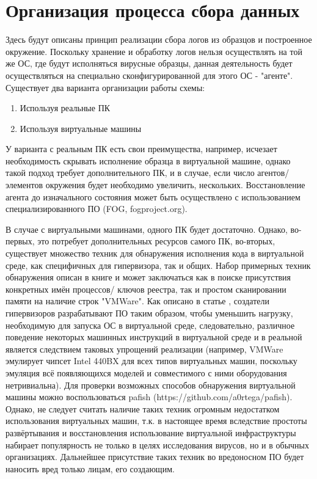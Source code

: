 \section {Организация процесса сбора данных}
Здесь будут описаны принцип реализации сбора логов из образцов и построенное окружение. Поскольку
хранение и обработку логов нельзя осуществлять на той же ОС, где будут исполняться вирусные образцы,
данная деятельность будет осуществляться на специально сконфигурированной для этого ОС - "агенте". Существует два варианта организации работы схемы:
\begin {enumerate}
	\item Используя реальные ПК
	\item Используя виртуальные машины
\end {enumerate}
У варианта с реальным ПК есть свои преимущества, например, исчезает необходимость скрывать исполнение
образца в виртуальной машине, однако такой подход требует дополнительного ПК, и в случае,
если число агентов/ элементов окружения будет необходимо увеличить, нескольких. Восстановление агента
до изначального состояния может быть осуществлено с использованием специализированного ПО (FOG, fogproject.org).

В случае с виртуальными машинами, одного ПК будет достаточно. Однако, во-первых, это потребует дополнительных ресурсов самого ПК, во-вторых, существует множество техник для обнаружения исполнения кода в виртуальной среде, как специфичных для гипервизора, так и общих. Набор примерных техник обнаружения описан в  книге \cite{MALWAREANALYSIS} и может заключаться как в поиске присутствия конкретных имён процессов/ ключов реестра, так и простом сканировании памяти на наличие строк "VMWare".  Как описано в статье \cite {VMMYTHS}, создатели гипервизоров разрабатывают ПО таким образом, чтобы уменьшить нагрузку,  необходимую для запуска ОС в виртуальной среде, следовательно, различное поведение некоторых машинных инструкций в виртуальной среде и в реальной является следствием таковых упрощений реализации (например, VMWare эмулирует чипсет Intel 440BX для всех типов виртуальных машин, поскольку эмуляция всё появляющихся моделей и совместимого с ними оборудования нетривиальна). Для проверки возможных способов обнаружения виртуальной машины можно воспользоваться pafish (https://github.com/a0rtega/pafish). Однако, не следует считать наличие таких техник огромным недостатком использования виртуальных машин, т.к. в настоящее время вследствие простоты развёртывания и восстановления использование виртуальной инфраструктуры набирает популярность не только в целях исследования вирусов, но и в обычных организациях. Дальнейшее присутствие таких техник во вредоносном ПО будет наносить вред только лицам, его создающим.

